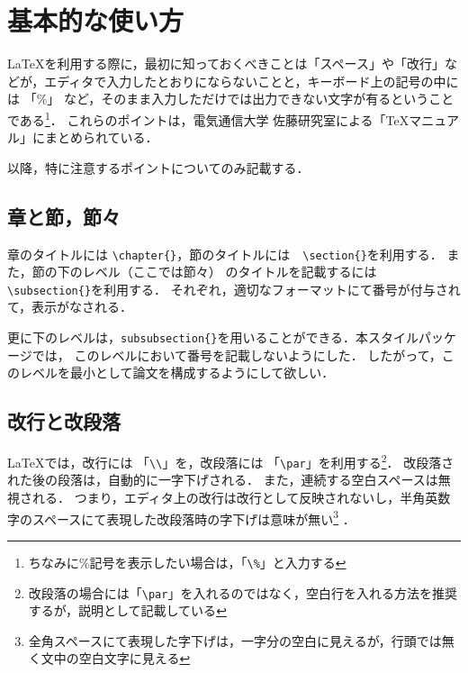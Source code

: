 \section{基本的な使い方}
\LaTeX を利用する際に，最初に知っておくべきことは「スペース」や「改行」などが，エディタで入力したとおりにならないことと，キーボード上の記号の中には 「\%」 など，そのまま入力しただけでは出力できない文字が有るということである\footnote{ちなみに\%記号を表示したい場合は，「\verb+\%+」と入力する}．
これらのポイントは，電気通信大学 佐藤研究室による「TeXマニュアル」\cite{HTUlatex}にまとめられている．

以降，特に注意するポイントについてのみ記載する．
\subsection{章と節，節々}
章のタイトルには \verb+\chapter{}+，節のタイトルには　\verb+\section{}+を利用する．
また，節の下のレベル（ここでは節々） のタイトルを記載するには \verb+\subsection{}+を利用する．
それぞれ，適切なフォーマットにて番号が付与されて，表示がなされる．

更に下のレベルは，\verb+subsubsection{}+を用いることができる．本スタイルパッケージでは，
このレベルにおいて番号を記載しないようにした．
したがって，このレベルを最小として論文を構成するようにして欲しい．

\subsection{改行と改段落}
\LaTeX では，改行には 「\verb+\\+」を，改段落には 「\verb+\par+」を利用する\footnote{改段落の場合には「\verb+\par+」を入れるのではなく，空白行を入れる方法を推奨するが，説明として記載している}．
改段落された後の段落は，自動的に一字下げされる．
また，連続する空白スペースは無視される．
つまり，エディタ上の改行は改行として反映されないし，半角英数字のスペースにて表現した改段落時の字下げは意味が無い\footnote{全角スペースにて表現した字下げは，一字分の空白に見えるが，行頭では無く文中の空白文字に見える}
．

